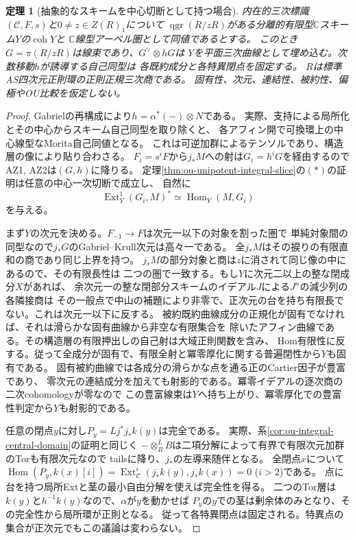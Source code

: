 \documentclass[11pt,a4paper]{ltjsarticle}
\newtheorem{theorem}{定理}[section]
\theoremstyle{definition}
\newcommand{\qgr}{\operatorname{qgr}}
\newcommand{\coh}{\operatorname{coh}}
\begin{document}
\begin{theorem}[抽象的なスキームを中心切断として持つ場合]
\label{thm:ou-abstract-reduced-central-curve}
内在的三次標識$(\mathcal C,F,s)$と$0\ne z\in Z(R)_1$について
$\qgr(R/zR)$がある分離的有限型$\mathbb C$スキーム$Y$の$\coh Y$と
$\mathbb C$線型アーベル圏として同値であるとする。
このとき$G=\pi(R/zR)$は線束であり、$G^\vee\otimes hG$は
$Y$を平面三次曲線として埋め込む。次数移動$h$が誘導する自己同型は
各既約成分と各特異閉点を固定する。
$R$は標準AS四次元正則環の正則正規三次商である。
固有性、次元、連結性、被約性、偏極やOU比較を仮定しない。
\end{theorem}
\begin{proof}
Gabrielの再構成\cite{Gabriel1962}により$h=\alpha^*(-)\otimes N$である。
実際、支持による局所化とその中心からスキーム自己同型を取り除くと、
各アフィン開で可換環上の中心線型なMorita自己同値となる。
これは可逆加群によるテンソルであり、構造層の像により貼り合わさる。
$F_i=s^iF$から$j_*M$への射は$G_i=h^iG$を経由するのでAZ1, AZ2は$(G,h)$に降りる。
定理\ref{thm:ou-unipotent-integral-slice}の$(*)$の証明は任意の中心一次切断で成立し、
自然に
\[
 \operatorname{Ext}^1_Y(G_i,M)^*\simeq\operatorname{Hom}_Y(M,G_i)
 \tag{**}
\]
を与える。

まず$Y$の次元を決める。$F_{-1}\to F$は次元一以下の対象を割った圏で
単純対象間の同型なので$j_*G$のGabriel--Krull次元は高々一である。
全$j_*M$はその捩りの有限直和の商であり同じ上界を持つ。
$j_*M$の部分対象と商は$z$に消されて同じ像の中にあるので、その有限長性は
二つの圏で一致する。もし$Y$に次元二以上の整な閉成分$X$があれば、
余次元一の整な閉部分スキームのイデアル$J$による$J^n$の減少列の各隣接商は
その一般点で中山の補題により非零で、正次元の台を持ち有限長でない。これは次元一以下に反する。
被約既約曲線成分の正規化が固有でなければ、それは滑らかな固有曲線から非空な有限集合を
除いたアフィン曲線である。その構造層の有限押出しの自己射は大域正則関数を含み、
Hom有限性に反する。従って全成分が固有で、有限全射と冪零厚化に関する普遍閉性から$Y$も固有である。
固有被約曲線では各成分の滑らかな点を通る正のCartier因子が豊富であり、
零次元の連結成分を加えても射影的である。冪零イデアルの逐次商の二次cohomologyが零なので
この豊富線束は$Y$へ持ち上がり、冪零厚化での豊富性判定から$Y$も射影的である。

任意の閉点$y$に対し$P_y=Lj^*j_*k(y)$は完全である。
実際、系\ref{cor:ou-integral-central-domain}の証明と同じく
$-\otimes_R^L B$は二項分解によって有界で有限次元加群のTorも有限次元なので
tailsに降り、$j_*$の左導来随伴となる。
全閉点$x$について$\operatorname{Hom}(P_y,k(x)[i])
=\operatorname{Ext}^i_{\mathcal C}(j_*k(y),j_*k(x))=0$ ($i>2$)である。
点に台を持つ局所Extと茎の最小自由分解を使えば完全性を得る。
二つのTor層は$k(y)$と$h^{-1}k(y)$なので、$\alpha$が$y$を動かせば
$P_y$の$y$での茎は剰余体のみとなり、その完全性から局所環が正則となる。
従って各特異閉点は固定される。特異点の集合が正次元でもこの議論は変わらない。


\end{proof}
\end{document}

